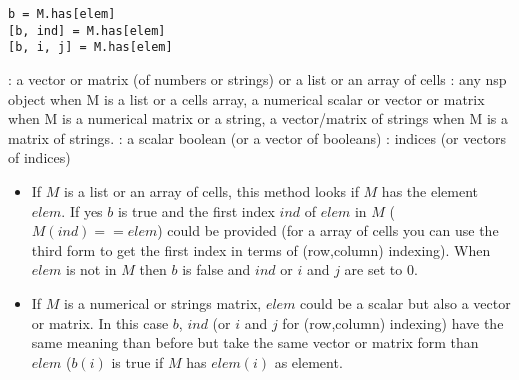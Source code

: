 
\begin{mandesc}
\end{mandesc}

\begin{calling_sequence}
\begin{verbatim}
b = M.has[elem]
[b, ind] = M.has[elem]
[b, i, j] = M.has[elem]
\end{verbatim}
\end{calling_sequence}
\begin{parameters}
  \begin{varlist}
    :  a vector or matrix (of numbers or strings) or a list
    or an array of cells
    : any nsp object when M is a list or a cells array, a
    numerical scalar or vector or matrix when M is a numerical matrix 
    or a string, a vector/matrix of strings when M is a matrix
    of strings.
    : a scalar boolean (or a vector of booleans)               
    : indices (or vectors of indices)
  \end{varlist}
\end{parameters}

\begin{mandescription}
\begin{itemize}
\item  If $M$ is a list or an array of cells, this method looks if $M$
  has the element $elem$. If yes $b$ is true and the first index $ind$ 
  of $elem$ in $M$ ($M(ind)==elem$) could be provided (for a array
  of cells you can use the third form to get the first index in terms
  of (row,column) indexing). When $elem$ is not in $M$ then $b$ is false
  and $ind$ or $i$ and $j$ are set to 0.

\item If $M$ is a numerical or strings matrix, $elem$ could be a scalar but
  also a vector or matrix. In this case $b$, $ind$ (or $i$
  and $j$ for (row,column) indexing) have the same meaning than before
  but take the same vector or matrix form than $elem$ ($b(i)$ is true
  if $M$ has $elem(i)$ as element.
\end{itemize}

\end{mandescription}

